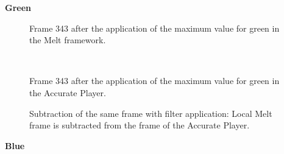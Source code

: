 \documentclass[../MasterThesis.tex]{subfiles}
\begin{document}
\vspace*{-1em}



\textbf{Green}

\vspace*{-1em}

\begin{minipage}{0.48\textwidth}
	
	\begin{figure}[H]
		\begin{center}
			\caption[]{\small Frame 343 after the application of the maximum value for green in the Melt framework.}
		\end{center}
	\end{figure}
\end{minipage}\begin{minipage}{0.04\textwidth}
	\ 
\end{minipage}\begin{minipage}{0.48\textwidth}
	
	\begin{figure}[H]
		\begin{center}
			\caption[]{\small Frame 343 after the application of the maximum value for green in the Accurate Player.}
		\end{center}
	\end{figure}
\end{minipage}

\vspace*{-1em}

\begin{figure}[H]
	\begin{center}
		\caption[]{\small Subtraction of the same frame with filter application: Local Melt frame is subtracted from the frame of the Accurate Player.}
	\end{center}
\end{figure}









\textbf{Blue}

\vspace*{-1em}
\end{document}
